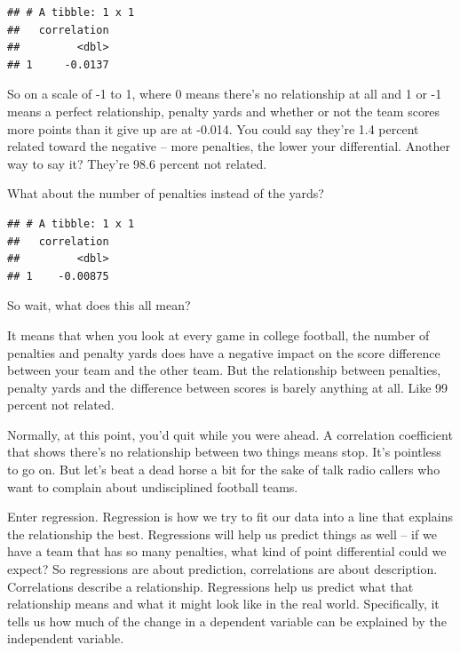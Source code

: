 \documentclass[
]{book}
\newenvironment{Shaded}{\begin{snugshade}}{\end{snugshade}}
\newcommand{\DataTypeTok}[1]{\textcolor[rgb]{0.13,0.29,0.53}{#1}}
\newcommand{\KeywordTok}[1]{\textcolor[rgb]{0.13,0.29,0.53}{\textbf{#1}}}
\newcommand{\NormalTok}[1]{#1}
\newcommand{\OperatorTok}[1]{\textcolor[rgb]{0.81,0.36,0.00}{\textbf{#1}}}
\newcommand{\StringTok}[1]{\textcolor[rgb]{0.31,0.60,0.02}{#1}}
\begin{document}
\begin{verbatim}
## # A tibble: 1 x 1
##   correlation
##         <dbl>
## 1     -0.0137
\end{verbatim}

So on a scale of -1 to 1, where 0 means there's no relationship at all and 1 or -1 means a perfect relationship, penalty yards and whether or not the team scores more points than it give up are at -0.014. You could say they're 1.4 percent related toward the negative -- more penalties, the lower your differential. Another way to say it? They're 98.6 percent not related.

What about the number of penalties instead of the yards?

\begin{Shaded}
\end{Shaded}

\begin{verbatim}
## # A tibble: 1 x 1
##   correlation
##         <dbl>
## 1    -0.00875
\end{verbatim}

So wait, what does this all mean?

It means that when you look at every game in college football, the number of penalties and penalty yards does have a negative impact on the score difference between your team and the other team. But the relationship between penalties, penalty yards and the difference between scores is barely anything at all. Like 99 percent not related.

Normally, at this point, you'd quit while you were ahead. A correlation coefficient that shows there's no relationship between two things means stop. It's pointless to go on. But let's beat a dead horse a bit for the sake of talk radio callers who want to complain about undisciplined football teams.

Enter regression. Regression is how we try to fit our data into a line that explains the relationship the best. Regressions will help us predict things as well -- if we have a team that has so many penalties, what kind of point differential could we expect? So regressions are about prediction, correlations are about description. Correlations describe a relationship. Regressions help us predict what that relationship means and what it might look like in the real world. Specifically, it tells us how much of the change in a dependent variable can be explained by the independent variable.
\end{document}
